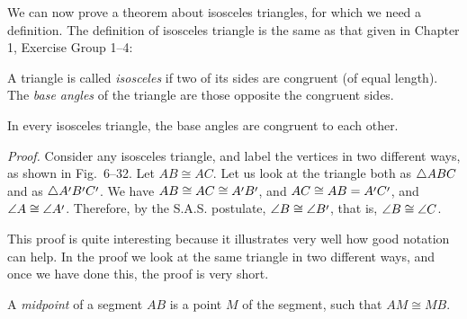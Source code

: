 \documentclass[11pt]{book}
\begin{document}
We can now prove a theorem about isosceles triangles, for which we need a
definition. The definition of isosceles triangle is the same as that given in
Chapter 1, Exercise Group 1--4:

\begin{definition}
A triangle is called \emph{isosceles} if two of its sides are congruent (of
equal length). The \emph{base angles} of the triangle are those opposite the
congruent sides.
\end{definition}

\begin{theorem}
In every isosceles triangle, the base angles are congruent to each other.
\end{theorem}

\emph{Proof.} Consider any isosceles triangle, and label the vertices in two
different ways, as shown in Fig.~6--32. Let $AB \cong AC$. Let us look at
the triangle both as $\triangle ABC$ and as $\tri{A\VIpr B\VIpr C\VIpr}$. We have
$AB \cong AC \cong A\VIpr B\VIpr$, and $AC \cong AB = A\VIpr C\VIpr$, and
$\ang{A} \cong \ang{A\VIpr}$. Therefore, by the S.A.S. postulate, $\ang{B}
\cong \ang{B\VIpr}$, that is, $\angle B \cong \angle C$.

This proof is quite interesting because it illustrates very well how good
notation can help. In the proof we look at the same triangle in two different
ways, and once we have done this, the proof is very short.

\FIGVITHIRTYTWO

\begin{definition}
A \emph{midpoint} of a segment $AB$ is a point $M$ of the segment, such that
$AM \cong MB$.
\end{definition}
\end{document}
